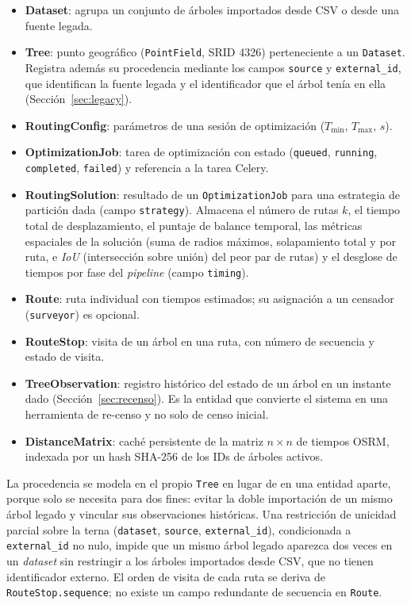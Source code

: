 \begin{itemize}
  \item \textbf{Dataset}: agrupa un conjunto de árboles importados desde CSV o desde una fuente legada.
  \item \textbf{Tree}: punto geográfico (\texttt{PointField}, SRID 4326) perteneciente a un \texttt{Dataset}. Registra además su procedencia mediante los campos \texttt{source} y \texttt{external\_id}, que identifican la fuente legada y el identificador que el árbol tenía en ella (Sección~\ref{sec:legacy}).
  \item \textbf{RoutingConfig}: parámetros de una sesión de optimización ($T_{\min}$, $T_{\max}$, $s$).
  \item \textbf{OptimizationJob}: tarea de optimización con estado (\texttt{queued}, \texttt{running}, \texttt{completed}, \texttt{failed}) y referencia a la tarea Celery.
  \item \textbf{RoutingSolution}: resultado de un \texttt{OptimizationJob} para una estrategia de partición dada (campo \texttt{strategy}). Almacena el número de rutas $k$, el tiempo total de desplazamiento, el puntaje de balance temporal, las métricas espaciales de la solución (suma de radios máximos, solapamiento total y por ruta, e \textit{IoU} (intersección sobre unión) del peor par de rutas) y el desglose de tiempos por fase del \textit{pipeline} (campo \texttt{timing}).
  \item \textbf{Route}: ruta individual con tiempos estimados; su asignación a un censador (\texttt{surveyor}) es opcional.
  \item \textbf{RouteStop}: visita de un árbol en una ruta, con número de secuencia y estado de visita.
  \item \textbf{TreeObservation}: registro histórico del estado de un árbol en un instante dado (Sección~\ref{sec:recenso}). Es la entidad que convierte el sistema en una herramienta de re-censo y no solo de censo inicial.
  \item \textbf{DistanceMatrix}: caché persistente de la matriz $n \times n$ de tiempos OSRM, indexada por un hash SHA-256 de los IDs de árboles activos.
\end{itemize}

La procedencia se modela en el propio \texttt{Tree} en lugar de en una entidad
aparte, porque solo se necesita para dos fines: evitar la doble importación de un
mismo árbol legado y vincular sus observaciones históricas. Una restricción de
unicidad parcial sobre la terna (\texttt{dataset}, \texttt{source},
\texttt{external\_id}), condicionada a \texttt{external\_id} no nulo, impide que un
mismo árbol legado aparezca dos veces en un \textit{dataset} sin restringir a los
árboles importados desde CSV, que no tienen identificador externo. El orden de visita
de cada ruta se deriva de \texttt{RouteStop.sequence}; no existe un campo redundante
de secuencia en \texttt{Route}.

